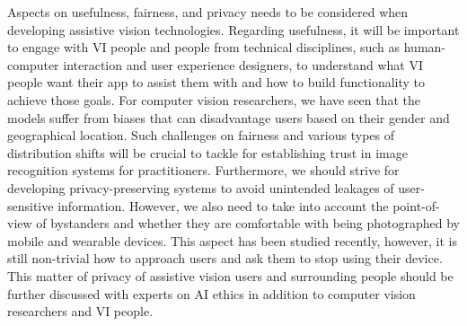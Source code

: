 Aspects on usefulness, fairness, and privacy needs to be considered when developing assistive vision technologies. Regarding usefulness, it will be important to engage with VI people and people from technical disciplines, such as human-computer interaction and user experience designers, to understand what VI people want their app to assist them with and how to build functionality to achieve those goals. For computer vision researchers, we have seen that the models suffer from biases that can disadvantage users based on their gender and geographical location. Such challenges on fairness and various types of distribution shifts will be crucial to tackle for establishing trust in image recognition systems for practitioners. Furthermore, we should strive for developing privacy-preserving systems to avoid unintended leakages of user-sensitive information. However, we also need to take into account the point-of-view of bystanders and whether they are comfortable with being photographed by mobile and wearable devices. This aspect has been studied recently, however, it is still non-trivial how to approach users and ask them to stop using their device. This matter of privacy of assistive vision users and surrounding people should be further discussed with experts on AI ethics in addition to computer vision researchers and VI people. 





 









